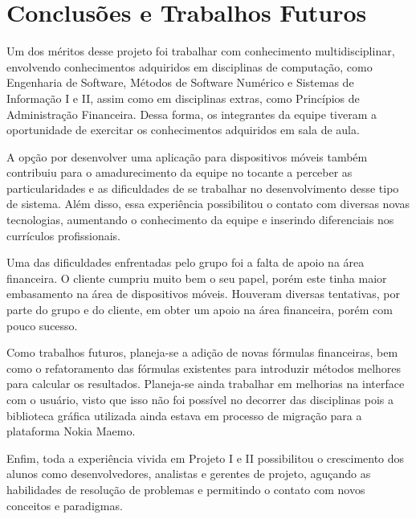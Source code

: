 \chapter{Conclusões e Trabalhos Futuros}

Um dos méritos desse projeto foi trabalhar com conhecimento multidisciplinar, envolvendo 
conhecimentos adquiridos em disciplinas de computação, como Engenharia de Software, Métodos de Software Numérico e Sistemas de Informação I e II, assim como em disciplinas extras, como
Princípios de Administração Financeira. Dessa forma, os integrantes da equipe tiveram a
oportunidade de exercitar os conhecimentos adquiridos em sala de aula.

A opção por desenvolver uma aplicação para dispositivos móveis também contribuiu para o amadurecimento da equipe no tocante a perceber as particularidades e as dificuldades de se trabalhar no desenvolvimento desse tipo de sistema. Além disso, essa experiência possibilitou o contato com diversas novas tecnologias, aumentando o conhecimento da equipe e inserindo diferenciais nos currículos profissionais.

Uma das dificuldades enfrentadas pelo grupo foi a falta de apoio na área financeira. O cliente cumpriu muito bem o seu papel, porém este tinha maior embasamento na área de dispositivos móveis. Houveram diversas tentativas, por parte do grupo e do cliente, em obter um apoio na área financeira, porém com pouco sucesso.

Como trabalhos futuros, planeja-se a adição de novas fórmulas financeiras, bem como o refatoramento das fórmulas existentes para introduzir métodos melhores para calcular os resultados. Planeja-se ainda trabalhar em melhorias na interface com o usuário, visto que isso não foi possível no decorrer das disciplinas pois a biblioteca gráfica utilizada ainda estava em processo de migração para a plataforma Nokia Maemo.

Enfim, toda a experiência vivida em Projeto I e II possibilitou o crescimento dos alunos como
desenvolvedores, analistas e gerentes de projeto, aguçando as habilidades de reso\-lução
de problemas e permitindo o contato com novos conceitos e paradigmas.